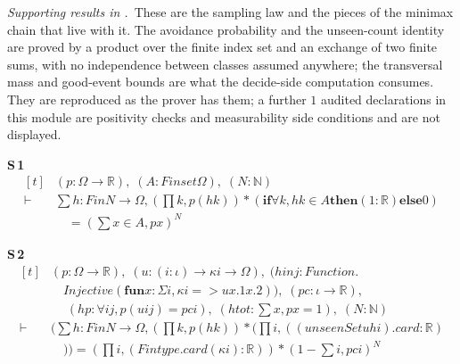 
\noindent\emph{Supporting results in .}~These are the sampling law and the pieces of the minimax chain that live with it. The avoidance probability and the unseen-count identity are proved by a product over the finite index set and an exchange of two finite sums, with no independence between classes assumed anywhere; the transversal mass and good-event bounds are what the decide-side computation consumes. They are reproduced as the prover has them; a further $1$ audited declarations in this module are positivity checks and measurability side conditions and are not displayed.

\noindent\textbf{S\,1}\quad{}
{\footnotesize\[ \begin{aligned}[t]
&(\mathit{p} : \Omega \to \mathbb{R} ),\; (\mathit{A} : \mathit{Finset} \Omega ),\; (\mathit{N} : \mathbb{N} )\\
\vdash\;&\textstyle\sum \mathit{h} : \mathit{Fin} \mathit{N} \to \Omega , (\textstyle\prod \mathit{k}, \mathit{p} (\mathit{h} \mathit{k})) * (\mathbf{if} \forall \mathit{k}, \mathit{h} \mathit{k} \in \mathit{A} \mathbf{then} (1:\mathbb{R} ) \mathbf{else} 0)\\
&\quad = (\textstyle\sum \mathit{x} \in \mathit{A}, \mathit{p} \mathit{x}) ^{\mathit{N}}
\end{aligned} \]}

\noindent\textbf{S\,2}\quad{}
{\footnotesize\[ \begin{aligned}[t]
&(\mathit{p} : \Omega \to \mathbb{R} ),\; (\mathit{u} : (\mathit{i} : \iota ) \to \kappa \mathit{i} \to \Omega ),\; (\mathit{hinj} : \mathit{Function}.\\
&\quad \mathit{Injective} (\mathbf{fun} \mathit{x} : \Sigma \mathit{i}, \kappa \mathit{i} => \mathit{u} \mathit{x}.1 \mathit{x}.2)),\; (\mathit{pc} : \iota \to \mathbb{R} ),\\
&\quad \; (\mathit{hp} : \forall \mathit{i} \mathit{j}, \mathit{p} (\mathit{u} \mathit{i} \mathit{j}) = \mathit{pc} \mathit{i}),\; (\mathit{htot} : \textstyle\sum \mathit{x}, \mathit{p} \mathit{x} = 1),\; (\mathit{N} : \mathbb{N} )\\
\vdash\;&(\textstyle\sum \mathit{h} : \mathit{Fin} \mathit{N} \to \Omega , (\textstyle\prod \mathit{k}, \mathit{p} (\mathit{h} \mathit{k})) * (\textstyle\prod \mathit{i}, ((\mathit{unseenSet} \mathit{u} \mathit{h} \mathit{i}).\mathit{card} : \mathbb{R} )\\
&\quad )) = (\textstyle\prod \mathit{i}, (\mathit{Fintype}.\mathit{card} (\kappa \mathit{i}) : \mathbb{R} )) * (1 - \textstyle\sum \mathit{i}, \mathit{pc} \mathit{i}) ^{\mathit{N}}
\end{aligned} \]}

